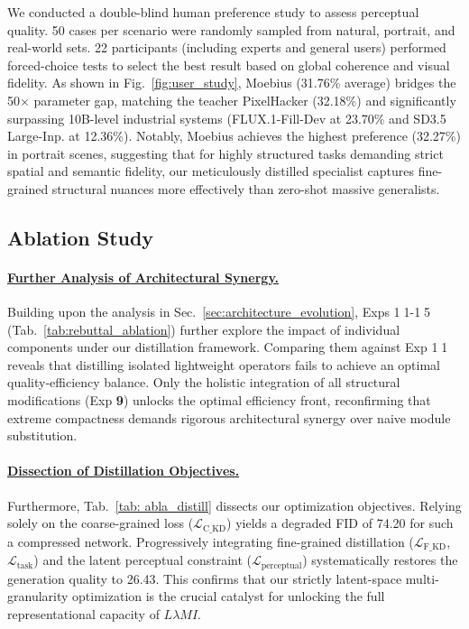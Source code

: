 \documentclass{llmxive}
\begin{document}
We conducted a double-blind human preference study to assess perceptual quality.
50 cases per scenario were randomly sampled from natural, portrait, and real-world sets. 22 participants (including experts and general users) performed forced-choice tests to select the best result based on global coherence and visual fidelity.
As shown in Fig.~\ref{fig:user_study}, Moebius (31.76\% average) bridges the 50$\times$ parameter gap, matching the teacher PixelHacker (32.18\%) and significantly surpassing 10B-level industrial systems (FLUX.1-Fill-Dev at 23.70\% and SD3.5 Large-Inp. at 12.36\%). Notably, Moebius achieves the highest preference (32.27\%) in portrait scenes, suggesting that for highly structured tasks demanding strict spatial and semantic fidelity, our meticulously distilled specialist captures fine-grained structural nuances more effectively than zero-shot massive generalists.

\vspace{-0.8em}
\subsection{Ablation Study}\label{subsec:abla}

\paragraph{\underline{Further Analysis of Architectural Synergy.}}
Building upon the analysis in Sec.~\ref{sec:architecture_evolution}, Exps \textcircled{\scriptsize 11}-\textcircled{\scriptsize 15} (Tab.~\ref{tab:rebuttal_ablation}) further explore the impact of individual components under our distillation framework. Comparing them against Exp \textcircled{\scriptsize 11} reveals that distilling isolated lightweight operators fails to achieve an optimal quality-efficiency balance. Only the holistic integration of all structural modifications (Exp \textcircled{\scriptsize \textbf{9}}) unlocks the optimal efficiency front, reconfirming that extreme compactness demands rigorous architectural synergy over naive module substitution.

\paragraph{\underline{Dissection of Distillation Objectives.}}
Furthermore, Tab.~\ref{tab: abla_distill} dissects our optimization objectives. Relying solely on the coarse-grained loss ($\mathcal{L}_\text{C\_KD}$) yields a degraded FID of 74.20 for such a compressed network. Progressively integrating fine-grained distillation ($\mathcal{L}_\text{F\_KD}$, $\mathcal{L}_\text{task}$) and the latent perceptual constraint ($\mathcal{L}_\text{perceptual}$) systematically restores the generation quality to 26.43. This confirms that our strictly latent-space multi-granularity optimization is the crucial catalyst for unlocking the full representational capacity of $L\lambda MI$.
\end{document}
